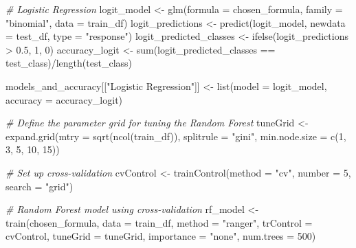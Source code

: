 \documentclass[
]{article}
\newenvironment{Shaded}{\begin{snugshade}}{\end{snugshade}}
\newcommand{\AttributeTok}[1]{\textcolor[rgb]{0.77,0.63,0.00}{#1}}
\newcommand{\CommentTok}[1]{\textcolor[rgb]{0.56,0.35,0.01}{\textit{#1}}}
\newcommand{\DecValTok}[1]{\textcolor[rgb]{0.00,0.00,0.81}{#1}}
\newcommand{\FloatTok}[1]{\textcolor[rgb]{0.00,0.00,0.81}{#1}}
\newcommand{\FunctionTok}[1]{\textcolor[rgb]{0.00,0.00,0.00}{#1}}
\newcommand{\NormalTok}[1]{#1}
\newcommand{\OtherTok}[1]{\textcolor[rgb]{0.56,0.35,0.01}{#1}}
\newcommand{\SpecialCharTok}[1]{\textcolor[rgb]{0.00,0.00,0.00}{#1}}
\newcommand{\StringTok}[1]{\textcolor[rgb]{0.31,0.60,0.02}{#1}}
\begin{document}
\begin{Shaded}
\begin{Highlighting}[]
    \CommentTok{\# Logistic Regression}
\NormalTok{    logit\_model }\OtherTok{\textless{}{-}} \FunctionTok{glm}\NormalTok{(}\AttributeTok{formula =}\NormalTok{ chosen\_formula, }\AttributeTok{family =} \StringTok{"binomial"}\NormalTok{, }\AttributeTok{data =}\NormalTok{ train\_df)}
\NormalTok{    logit\_predictions }\OtherTok{\textless{}{-}} \FunctionTok{predict}\NormalTok{(logit\_model, }\AttributeTok{newdata =}\NormalTok{ test\_df, }\AttributeTok{type =} \StringTok{"response"}\NormalTok{)}
\NormalTok{    logit\_predicted\_classes }\OtherTok{\textless{}{-}} \FunctionTok{ifelse}\NormalTok{(logit\_predictions }\SpecialCharTok{\textgreater{}} \FloatTok{0.5}\NormalTok{, }\DecValTok{1}\NormalTok{, }\DecValTok{0}\NormalTok{)}
\NormalTok{    accuracy\_logit }\OtherTok{\textless{}{-}} \FunctionTok{sum}\NormalTok{(logit\_predicted\_classes }\SpecialCharTok{==}\NormalTok{ test\_class)}\SpecialCharTok{/}\FunctionTok{length}\NormalTok{(test\_class)}

\NormalTok{    models\_and\_accuracy[[}\StringTok{"Logistic Regression"}\NormalTok{]] }\OtherTok{\textless{}{-}} \FunctionTok{list}\NormalTok{(}\AttributeTok{model =}\NormalTok{ logit\_model, }\AttributeTok{accuracy =}\NormalTok{ accuracy\_logit)}

    \CommentTok{\# Define the parameter grid for tuning the Random Forest}
\NormalTok{    tuneGrid }\OtherTok{\textless{}{-}} \FunctionTok{expand.grid}\NormalTok{(}\AttributeTok{mtry =} \FunctionTok{sqrt}\NormalTok{(}\FunctionTok{ncol}\NormalTok{(train\_df)), }\AttributeTok{splitrule =} \StringTok{"gini"}\NormalTok{, }\AttributeTok{min.node.size =} \FunctionTok{c}\NormalTok{(}\DecValTok{1}\NormalTok{,}
        \DecValTok{3}\NormalTok{, }\DecValTok{5}\NormalTok{, }\DecValTok{10}\NormalTok{, }\DecValTok{15}\NormalTok{))}

    \CommentTok{\# Set up cross{-}validation}
\NormalTok{    cvControl }\OtherTok{\textless{}{-}} \FunctionTok{trainControl}\NormalTok{(}\AttributeTok{method =} \StringTok{"cv"}\NormalTok{, }\AttributeTok{number =} \DecValTok{5}\NormalTok{, }\AttributeTok{search =} \StringTok{"grid"}\NormalTok{)}

    \CommentTok{\# Random Forest model using cross{-}validation}
\NormalTok{    rf\_model }\OtherTok{\textless{}{-}} \FunctionTok{train}\NormalTok{(chosen\_formula, }\AttributeTok{data =}\NormalTok{ train\_df, }\AttributeTok{method =} \StringTok{"ranger"}\NormalTok{, }\AttributeTok{trControl =}\NormalTok{ cvControl,}
        \AttributeTok{tuneGrid =}\NormalTok{ tuneGrid, }\AttributeTok{importance =} \StringTok{"none"}\NormalTok{, }\AttributeTok{num.trees =} \DecValTok{500}\NormalTok{)}


\end{Highlighting}
\end{Shaded}
\end{document}
